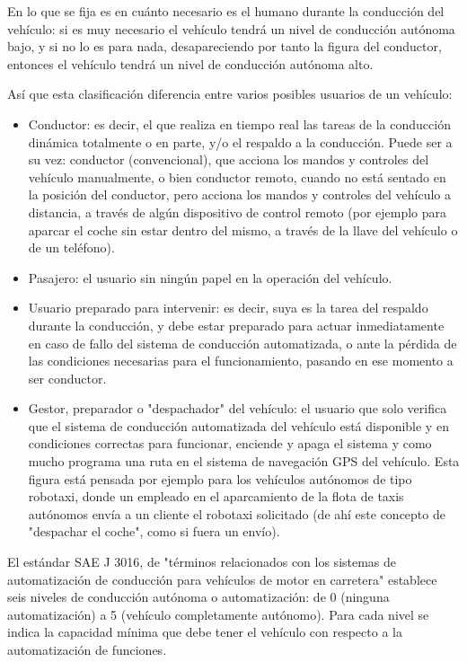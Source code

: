 \documentclass{pclass}
\begin{document}
En lo que se fija es en cuánto necesario es el humano durante la conducción del vehículo: si es muy necesario el vehículo tendrá un nivel de conducción autónoma bajo, y si no lo es para nada, desapareciendo por tanto la figura del conductor, entonces el vehículo tendrá un nivel de conducción autónoma alto.

Así que esta clasificación diferencia entre varios posibles usuarios de un vehículo:
\begin{itemize}
	\item Conductor: es decir, el que realiza en tiempo real las tareas de la conducción dinámica totalmente o en parte, y/o el respaldo a la conducción. Puede ser a su vez: conductor (convencional), que acciona los mandos y controles del vehículo manualmente, o bien conductor remoto, cuando no está sentado en la posición del conductor, pero acciona los mandos y controles del vehículo a distancia, a través de algún dispositivo de control remoto (por ejemplo para aparcar el coche sin estar dentro del mismo, a través de la llave del vehículo o de un teléfono).

	\item Pasajero: el usuario sin ningún papel en la operación del vehículo.

	\item Usuario preparado para intervenir: es decir, suya es la tarea del respaldo durante la conducción, y debe estar preparado para actuar inmediatamente en caso de fallo del sistema de conducción automatizada, o ante la pérdida de las condiciones necesarias para el funcionamiento, pasando en ese momento a ser conductor.

	\item Gestor, preparador o "despachador" del vehículo: el usuario que solo verifica que el sistema de conducción automatizada del vehículo está disponible y en condiciones correctas para funcionar, enciende y apaga el sistema y como mucho programa una ruta en el sistema de navegación GPS del vehículo. Esta figura está pensada por ejemplo para los vehículos autónomos de tipo robotaxi, donde un empleado en el aparcamiento de la flota de taxis autónomos envía a un cliente el robotaxi solicitado (de ahí este concepto de "despachar el coche", como si fuera un envío).


\end{itemize}

El estándar SAE J 3016, de "términos relacionados con los sistemas de automatización de conducción para vehículos de motor en carretera" establece seis niveles de conducción autónoma o automatización: de 0 (ninguna automatización) a 5 (vehículo completamente autónomo). Para cada nivel se indica la capacidad mínima que debe tener el vehículo con respecto a la automatización de funciones.
\end{document}

